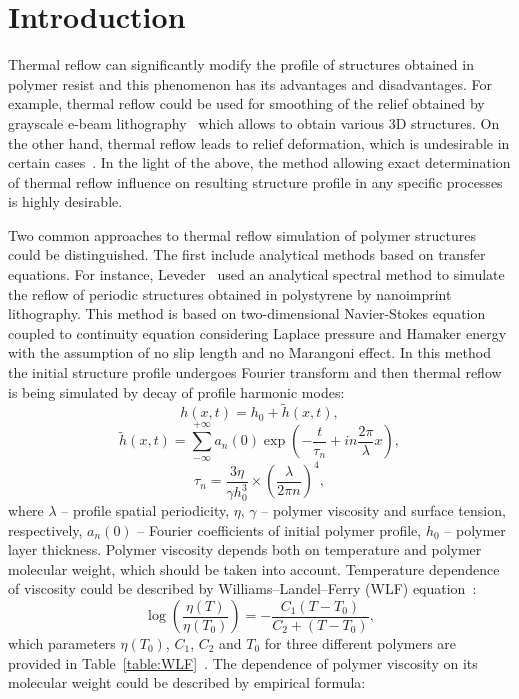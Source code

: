 \section{Introduction}

Thermal reflow can significantly modify the profile of structures obtained in polymer resist and this phenomenon has its advantages and disadvantages.
For example, thermal reflow could be used for smoothing of the relief obtained by grayscale e-beam lithography~\cite{Kirchner_GL_review} which allows to obtain various 3D structures.
On the other hand, thermal reflow leads to relief deformation, which is undesirable in certain cases~\cite{NIL_reflow}.
In the light of the above, the method allowing exact determination of thermal reflow influence on resulting structure profile in any specific processes is highly desirable.

Two common approaches to thermal reflow simulation of polymer structures could be distinguished.
The first include analytical methods based on transfer equations.
For instance, Leveder~\cite{Leveder_2010,Leveder_2011} used an analytical spectral method to simulate the reflow of periodic structures obtained in polystyrene by nanoimprint lithography.
This method is based on two-dimensional Navier-Stokes equation coupled to continuity equation  considering Laplace pressure and Hamaker energy with the assumption of no slip length and no Marangoni effect.
In this method the initial structure profile undergoes Fourier transform and then thermal reflow is being simulated by decay of profile harmonic modes:
\begin{equation} \label{eq:Fourier_1}
	h(x, t) = h_0 + \tilde{h}(x, t),
\end{equation}
\begin{equation} \label{eq:Fourier_2}
	\tilde{h}(x, t) = \sum_{-\infty}^{+\infty} a_n(0) \exp \left(-\frac{t}{\tau_n}+i n \frac{2 \pi}{\lambda} x \right),
\end{equation}
\begin{equation} \label{eq:Fourier_3}
	\tau_n = \frac{3 \eta}{\gamma h_0^3} \times \left( \frac{\lambda}{2 \pi n} \right)^4,
\end{equation}
where $\lambda$ -- profile spatial periodicity, $\eta$, $\gamma$ -- polymer viscosity and surface tension, respectively, $a_n(0)$ -- Fourier coefficients of initial polymer profile, $h_0$ -- polymer layer thickness.
Polymer viscosity depends both on temperature and polymer molecular weight, which should be taken into account.
Temperature dependence of viscosity could be described by Williams–Landel–Ferry (WLF) equation~\cite{Bird_WLF}:
\begin{equation} \label{eq:WLF}
	\log \left( \frac{\eta(T)}{\eta(T_0)} \right) = -\frac{C_1(T-T_0)}{C_2+(T-T_0)},
\end{equation}
which parameters $\eta(T_0)$, $C_1$, $C_2$ and $T_0$ for three different polymers are provided in Table~\ref{table:WLF}~\cite{Aho_WLF}.
The dependence of polymer viscosity on its molecular weight could be described by empirical formula:

